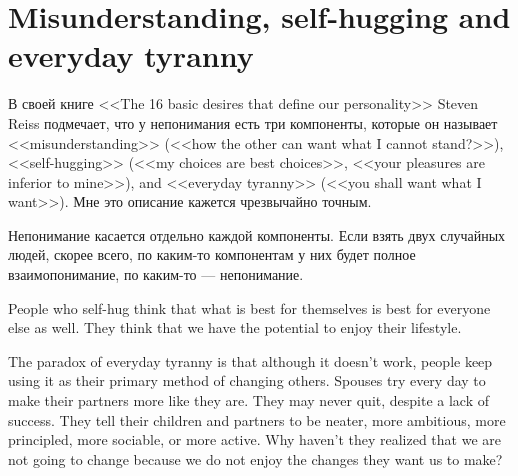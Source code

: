 \documentclass[11pt]{article}
\theoremstyle{remark}
\theoremstyle{definition}
\begin{document}



\section{Misunderstanding, self-hugging and everyday tyranny}

В своей книге <<The 16 basic desires that define our personality>> Steven Reiss подмечает, что у непонимания есть три компоненты, которые он называет <<misunderstanding>> (<<how the other can want what I cannot stand?>>), <<self-hugging>> (<<my choices are best choices>>, <<your pleasures are inferior to mine>>), and <<everyday tyranny>> (<<you shall want what I want>>). Мне это описание кажется чрезвычайно точным.

Непонимание касается отдельно каждой компоненты. Если взять двух случайных людей, скорее всего, по каким-то компонентам у них будет полное взаимопонимание, по каким-то --- непонимание.


People who self-hug think that what is best for themselves is best for everyone else as well. They think that we have the potential to enjoy their lifestyle.


The paradox of everyday tyranny is that although it doesn’t work, people keep using it as their primary method of changing others. Spouses try every day to make their partners more like they are. They may never quit, despite a lack of success. They tell their children and partners to be neater, more ambitious, more principled, more sociable, or more active. Why haven’t they realized that we are not going to change because we do not enjoy the changes they want us to make?
\end{document}
